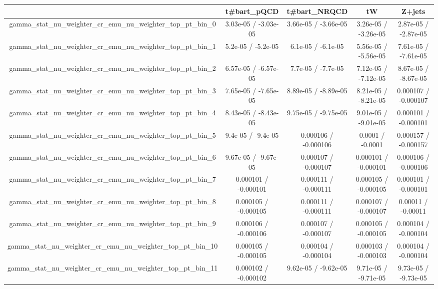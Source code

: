 \documentclass[10pt]{article}
\begin{document}
\begin{table}[htbp]
\begin{center}
\begin{tabular}{|c|c|c|c|c|}
\hline 
      & t#bar{t}_{pQCD}      & t#bar{t}_{NRQCD}      & tW      & Z+jets \\ 
\hline 
  gamma_stat_nu_weighter_cr_emu_nu_weighter_top_pt_bin_0 & 3.03e-05 / -3.03e-05 & 3.66e-05 / -3.66e-05 & 3.26e-05 / -3.26e-05 & 2.87e-05 / -2.87e-05 \\ 
  gamma_stat_nu_weighter_cr_emu_nu_weighter_top_pt_bin_1 & 5.2e-05 / -5.2e-05 & 6.1e-05 / -6.1e-05 & 5.56e-05 / -5.56e-05 & 7.61e-05 / -7.61e-05 \\ 
  gamma_stat_nu_weighter_cr_emu_nu_weighter_top_pt_bin_2 & 6.57e-05 / -6.57e-05 & 7.7e-05 / -7.7e-05 & 7.12e-05 / -7.12e-05 & 8.67e-05 / -8.67e-05 \\ 
  gamma_stat_nu_weighter_cr_emu_nu_weighter_top_pt_bin_3 & 7.65e-05 / -7.65e-05 & 8.89e-05 / -8.89e-05 & 8.21e-05 / -8.21e-05 & 0.000107 / -0.000107 \\ 
  gamma_stat_nu_weighter_cr_emu_nu_weighter_top_pt_bin_4 & 8.43e-05 / -8.43e-05 & 9.75e-05 / -9.75e-05 & 9.01e-05 / -9.01e-05 & 0.000101 / -0.000101 \\ 
  gamma_stat_nu_weighter_cr_emu_nu_weighter_top_pt_bin_5 & 9.4e-05 / -9.4e-05 & 0.000106 / -0.000106 & 0.0001 / -0.0001 & 0.000157 / -0.000157 \\ 
  gamma_stat_nu_weighter_cr_emu_nu_weighter_top_pt_bin_6 & 9.67e-05 / -9.67e-05 & 0.000107 / -0.000107 & 0.000101 / -0.000101 & 0.000106 / -0.000106 \\ 
  gamma_stat_nu_weighter_cr_emu_nu_weighter_top_pt_bin_7 & 0.000101 / -0.000101 & 0.000111 / -0.000111 & 0.000105 / -0.000105 & 0.000101 / -0.000101 \\ 
  gamma_stat_nu_weighter_cr_emu_nu_weighter_top_pt_bin_8 & 0.000105 / -0.000105 & 0.000111 / -0.000111 & 0.000107 / -0.000107 & 0.00011 / -0.00011 \\ 
  gamma_stat_nu_weighter_cr_emu_nu_weighter_top_pt_bin_9 & 0.000106 / -0.000106 & 0.000107 / -0.000107 & 0.000105 / -0.000105 & 0.000104 / -0.000104 \\ 
  gamma_stat_nu_weighter_cr_emu_nu_weighter_top_pt_bin_10 & 0.000105 / -0.000105 & 0.000104 / -0.000104 & 0.000103 / -0.000103 & 0.000104 / -0.000104 \\ 
  gamma_stat_nu_weighter_cr_emu_nu_weighter_top_pt_bin_11 & 0.000102 / -0.000102 & 9.62e-05 / -9.62e-05 & 9.71e-05 / -9.71e-05 & 9.73e-05 / -9.73e-05 \\ 

\end{tabular}
\end{center}
\end{table}
\end{document}
